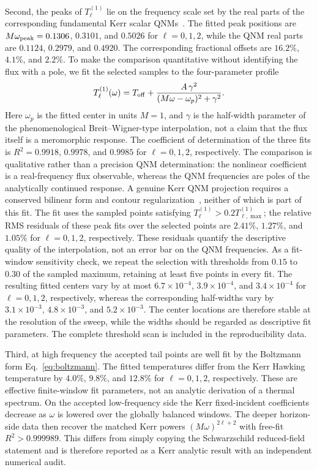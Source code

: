 \documentclass[aps,prd,twocolumn,10pt,nofootinbib,superscriptaddress,floatfix]{revtex4-2}
\begin{document}
Second, the peaks of $T_\ell^{(1)}$ lie on the frequency scale set by the real
parts of the corresponding fundamental Kerr scalar QNMs~\cite{Berti2009,Stein2019}.  The fitted peak
positions are $M\omega_{\rm peak}=0.1306$, $0.3101$, and $0.5026$ for
$\ell=0,1,2$, while the QNM real parts are $0.1124$, $0.2979$, and $0.4920$.
The corresponding fractional offsets are $16.2\%$, $4.1\%$, and
$2.2\%$.
To make the comparison quantitative without identifying the flux with a pole,
we fit the selected samples to the four-parameter profile
\begin{equation}
T_\ell^{(1)}(\omega)=T_{\rm off}+
\frac{A\,\gamma^2}{(M\omega-\omega_p)^2+\gamma^2} .
\label{eq:lorentzian}
\end{equation}
Here $\omega_p$ is the fitted center in units $M=1$, and $\gamma$ is the
half-width parameter of the phenomenological Breit--Wigner-type interpolation,
not a claim that the flux itself is a meromorphic response.
The coefficient of determination of the three fits is $R^2=0.9918$,
$0.9978$, and $0.9985$ for $\ell=0,1,2$, respectively.  The comparison is
qualitative rather than a precision QNM determination: the nonlinear
coefficient is a real-frequency flux observable, whereas the QNM frequencies
are poles of the analytically continued response.  A genuine Kerr QNM
projection requires a conserved bilinear form and contour
regularization~\cite{GreenEtAl2023}, neither of which is part of this fit.
The fit uses the sampled points satisfying $T_\ell^{(1)}>0.2T_{\ell,\max}^{(1)}$;
the relative RMS residuals of these peak fits over the selected points are
$2.41\%$, $1.27\%$, and $1.05\%$ for $\ell=0,1,2$, respectively.  These
residuals quantify the descriptive quality of the interpolation, not an error
bar on the QNM frequencies.
As a fit-window sensitivity check, we repeat the selection with thresholds
from $0.15$ to $0.30$ of the sampled maximum, retaining at least five points
in every fit.  The resulting fitted centers vary by at most
$6.7\times10^{-4}$, $3.9\times10^{-4}$, and $3.4\times10^{-4}$ for
$\ell=0,1,2$, respectively, whereas the corresponding half-widths vary by
$3.1\times10^{-3}$, $4.8\times10^{-3}$, and $5.2\times10^{-3}$.  The
center locations are therefore stable at the resolution of the sweep, while
the widths should be regarded as descriptive fit parameters.  The complete
threshold scan is included in the reproducibility data.

Third, at high frequency the accepted tail points are well fit by the
Boltzmann form Eq.~\eqref{eq:boltzmann}.  The fitted temperatures differ from
the Kerr Hawking temperature by $4.0\%$, $9.8\%$, and $12.8\%$ for
$\ell=0,1,2$, respectively.  These are effective finite-window fit
parameters, not an analytic derivation of a thermal spectrum.  On the accepted
low-frequency side the Kerr fixed-incident coefficients decrease as
$\omega$ is lowered over the globally balanced windows.  The deeper
horizon-side data then recover the matched Kerr powers $(M\omega)^{2\ell+2}$
with free-fit $R^2>0.999989$.  This differs from simply copying the
Schwarzschild reduced-field statement and is therefore reported as a Kerr
analytic result with an independent numerical audit.
\end{document}

